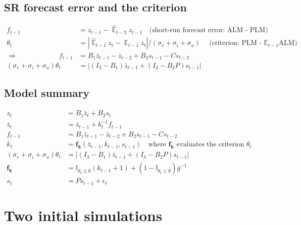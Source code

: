 \documentclass[11pt]{article}
\def \myFigPath {../figures/}
\renewcommand{\[}{\begin{equation}}
\renewcommand{\]}{\end{equation}}
\DeclareMathOperator{\E}{\mathbb{E}}
\def\mySmallerFigScale{0.18}
\begin{document}
\subsection{SR forecast error and the criterion}
\begin{align*}
f_{t-1} & = z_{t-1} - \hat{\E}_{t-2}z_{t-1} \quad \text{(short-run forecast error: ALM - PLM)} \\
\theta_t & = |\hat{\E}_{t-1}z_t - \E_{t-1}z_t  | / (\sigma_r + \sigma_i + \sigma_u) \quad \text{(criterion: PLM - $\E_{t-1}$ALM)} \\
\Rightarrow \quad \quad \quad \quad \quad \quad  f_{t-1} & = B_1 \bar{z}_{t-1} - \bar{z}_{t-2} +B_2 s_{t-1} -Cs_{t-2}\\
(\sigma_r + \sigma_i + \sigma_u) \theta_t & = |(I_3 - B_1)\bar{z}_{t-1} + (I_3 - B_2P)s_{t-1}|
\end{align*}

\subsection{Model summary}
\begin{align}
z_t & = B_1 \bar{z}_t + B_2 s_t  \tag{ALM} \\
\bar{z}_t & = \bar{z}_{t-1} + k_t^{-1} f_{t-1} \tag{Drift LOM}\\
f_{t-1} & = B_1 \bar{z}_{t-1} - \bar{z}_{t-2} +B_2 s_{t-1} -Cs_{t-2} \tag{SR fcst error}\\ 
k_t & = \mathbf{f_k}(\bar{z}_{t-1}, k_{t-1}, s_{t-1})  \quad \text{where $\mathbf{f_k}$ evaluates the criterion $\theta_t$}\tag{Gain LOM} \\
(\sigma_r + \sigma_i + \sigma_u) \theta_t & = |(I_3 - B_1)\bar{z}_{t-1} + (I_3 - B_2P)s_{t-1}| \tag{criterion}\\
 \mathbf{f_k} &= \mathbb{I}_{\theta_t \leq \bar{\theta}}(k_{t-1}+1) + (1-\mathbb{I}_{\theta_t \leq \bar{\theta}})\bar{g}^{-1} \tag{anchoring}\\
s_t &= Ps_{t-1} +\epsilon_t \tag{exog. process}
\end{align}

\section{Two initial simulations}	
\begin{figure}[h!]
\end{figure}
\end{document}
